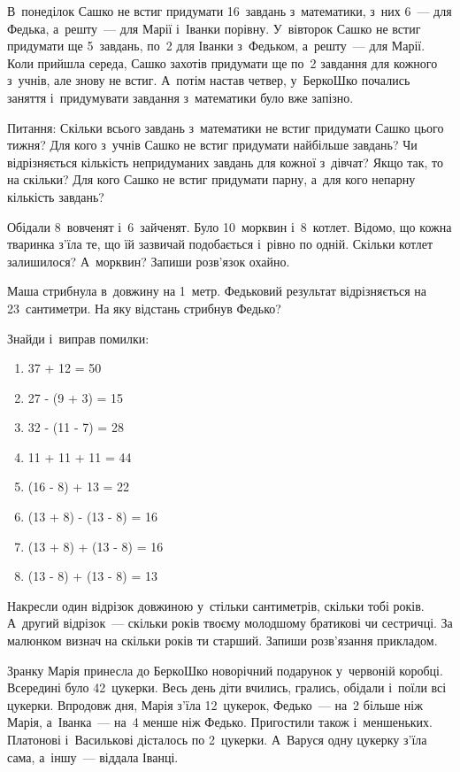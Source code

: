 \problem
В~понеділок Сашко не встиг придумати 16~завдань з~математики,
з~них 6~--- для Федька, а~решту~--- для Марії і~Іванки порівну.
У~вівторок Сашко не встиг придумати ще 5~завдань,
по~2 для Іванки з~Федьком, а~решту~--- для Марії.
Коли прийшла середа, Сашко захотів придумати
ще по~2 завдання для кожного з~учнів, але знову не встиг.
А~потім настав четвер, у~БеркоШко почались заняття
і~придумувати завдання з~математики було вже запізно.

Питання:
Скільки всього завдань з~математики не встиг придумати Сашко цього тижня?
Для кого з~учнів Сашко не встиг придумати найбільше завдань?
Чи відрізняється кількість непридуманих завдань для кожної з~дівчат?
Якщо так, то на скільки?
Для кого Сашко не встиг придумати парну, а~для кого непарну кількість завдань?


\problem
Обідали 8~вовченят і~6~зайченят. Було 10~морквин і~8~котлет.
Відомо, що кожна тваринка з'їла те, що їй зазвичай подобається
і~рівно по одній.
Скільки котлет залишилося? А~морквин? Запиши розв'язок охайно.


\problem
Маша стрибнула в~довжину на 1~метр.
Федьковий результат відрізняється на 23~сантиметри.
На яку відстань стрибнув Федько?


\problem
Знайди і~виправ помилки:
\begin{multicols}{2}
    \begin{enumerate}
        \item 37 + 12 = 50
        \item 27 - (9 + 3) = 15
        \item 32 - (11 - 7) = 28
        \item 11 + 11 + 11 = 44
        \item (16 - 8) + 13 = 22
        \item (13 + 8) - (13 - 8) = 16
        \item (13 + 8) + (13 - 8) = 16
        \item (13 - 8) + (13 - 8) = 13
    \end{enumerate}
\end{multicols}


\problem
Накресли один відрізок довжиною у~стільки сантиметрів, скільки тобі років.
А~другий відрізок~--- скільки років твоєму молодшому братикові чи сестричці.
За малюнком визнач на скільки років ти старший.
Запиши розв’язання прикладом.


\problem
Зранку Марія принесла до БеркоШко новорічний подарунок у~червоній коробці.
Всередині було 42~цукерки.
Весь день діти вчились, грались, обідали і~поїли всі цукерки.
Впродовж дня, Марія з’їла 12~цукерок, Федько~--- на~2 більше ніж Марія,
а~Іванка~--- на~4 менше ніж Федько.
Пригостили також і~меншеньких. Платонові і~Василькові дісталось по 2~цукерки.
А~Варуся одну цукерку з’їла сама, а~іншу~--- віддала Іванці.

